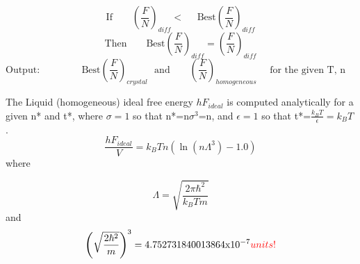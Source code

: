 \documentclass[12pt]{article}
\begin{document}
\begin{displaymath}\text{If~~~~~~}\left(\frac{F}{N}\right)_{diff}<\text{~~~~Best}\left(\frac{F}{N}\right)_{diff}\end{displaymath}
\begin{displaymath}\text{Then~~~~~~}\text{Best}\left(\frac{F}{N}\right)_{diff}=\left(\frac{F}{N}\right)_{diff}\end{displaymath}
\begin{displaymath}\text{Output:~~~~~~~~~~~~ Best}\left(\frac{F}{N}\right)_{crystal}\text{~~and~~~~~~}\left(\frac{F}{N}\right)_{homogeneous}\text{~~~~for the given T, n ~~~~~~~~~~~~~~~~~~~~~~~~~}\end{displaymath} 
\[\]

The Liquid (homogeneous) ideal free energy $hF_{ideal}$ is computed analytically for a given n* and t*, where $\sigma=1$ so that n*=n$\sigma^3$=n, and $\epsilon=1$ so that t*=$\frac{k_BT}{\epsilon}=k_BT$. 
\begin{displaymath}{\frac{hF_{ideal}}{V}=k_BTn(\ln(n\Lambda^3)-1.0)}\end{displaymath} where 

\begin{displaymath}{\Lambda =\sqrt{\frac{2\pi\hbar^2}{k_BTm}}}\end{displaymath}  and
\begin{displaymath}\left(\sqrt{\frac{2\hbar^2}{m}}\right)^3=4.752731840013864\text{x}10^{-7}\color{red}units!\color{black}\end{displaymath} 
\end{document}
